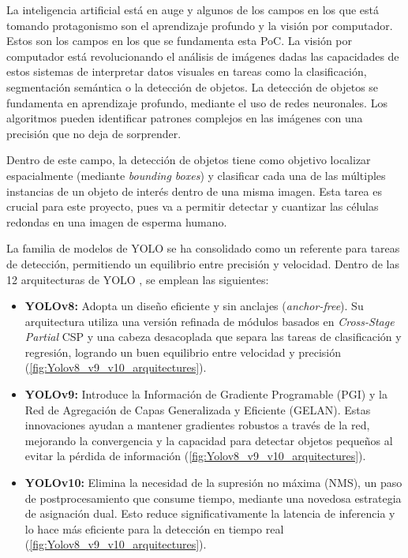\documentclass[12pt,a4paper,onecolumn,oneside]{report}
\begin{document}
La inteligencia artificial está en auge y algunos de los campos en los que está tomando protagonismo son el aprendizaje profundo y la visión por computador. 
Estos son los campos en los que se fundamenta esta PoC. La visión por computador está revolucionando el análisis de imágenes dadas las capacidades de estos 
sistemas de interpretar datos visuales en tareas como la clasificación, segmentación semántica o la detección de objetos.
La detección de objetos se fundamenta en aprendizaje profundo, mediante el uso de redes neuronales. Los algoritmos pueden identificar patrones complejos en las imágenes con una precisión 
que no deja de sorprender. 

Dentro de este campo, la detección de objetos tiene como objetivo localizar espacialmente (mediante \textit{bounding boxes}) y clasificar cada una de las múltiples instancias de un objeto de interés dentro de una misma imagen.
Esta tarea es crucial para este proyecto, pues va a permitir detectar y cuantizar las células redondas en una imagen de esperma humano.

La familia de modelos de YOLO \cite{ultralytics_models} se ha consolidado como un referente para tareas de detección, permitiendo un equilibrio entre precisión y velocidad.
Dentro de las 12 arquitecturas de YOLO \cite{ultralytics_models}, se emplean las siguientes:

\begin{itemize}
  \item \textbf{YOLOv8:} Adopta un diseño eficiente y sin anclajes (\textit{anchor-free}). Su arquitectura utiliza una versión refinada de módulos basados en \textit{Cross-Stage Partial} CSP y una cabeza desacoplada que separa las tareas de clasificación y regresión, logrando un buen equilibrio entre velocidad y precisión \cite{defyolos} (\autoref{fig:Yolov8_v9_v10_arquitectures}).
  \item \textbf{YOLOv9:} Introduce la Información de Gradiente Programable (PGI) y la Red de Agregación de Capas Generalizada y Eficiente (GELAN). Estas innovaciones ayudan a mantener gradientes robustos a través de la red, mejorando la convergencia y la capacidad para detectar objetos pequeños al evitar la pérdida de información \cite{defyolos} (\autoref{fig:Yolov8_v9_v10_arquitectures}).
  \item \textbf{YOLOv10:} Elimina la necesidad de la supresión no máxima (NMS), un paso de postprocesamiento que consume tiempo, mediante una novedosa estrategia de asignación dual. Esto reduce significativamente la latencia de inferencia y lo hace más eficiente para la detección en tiempo real \cite{defyolos} (\autoref{fig:Yolov8_v9_v10_arquitectures}).
\end{itemize}
\end{document}
